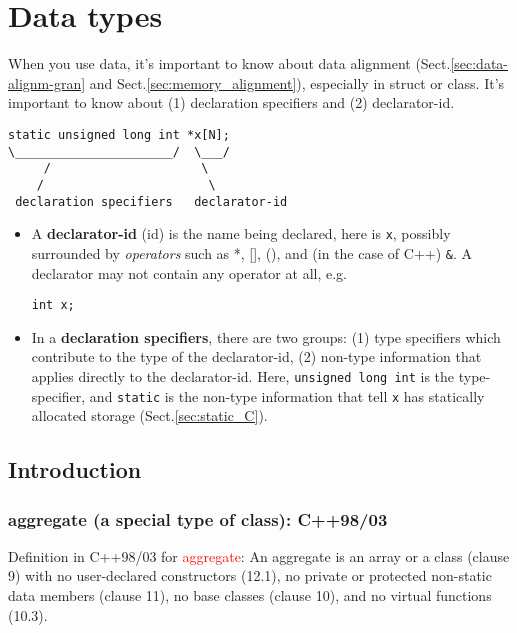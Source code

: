 \chapter{Data types}

When you use data, it's important to know about data alignment
(Sect.\ref{sec:data-alignm-gran} and Sect.\ref{sec:memory_alignment}),
especially in struct or class. It's important to know about (1) declaration
specifiers and (2) declarator-id.
\begin{verbatim}
static unsigned long int *x[N];
\______________________/  \___/
     /                     \
    /                       \
 declaration specifiers   declarator-id   
\end{verbatim}

\begin{itemize}
  \item  A {\bf declarator-id} (id) is the name being declared, here is \verb!x!, possibly
surrounded by {\it operators} such as *, [], (), and (in the case of C++)
\verb!&!.  A declarator may not contain any operator at all, e.g.
\begin{verbatim}
int x;
\end{verbatim}

   \item In a {\bf declaration specifiers}, there are two groups: (1) type specifiers which
contribute to the type of the declarator-id, (2) non-type information that
applies directly to the declarator-id. Here, \verb!unsigned long int! is the
type-specifier, and \verb!static! is the non-type information that tell \verb!x!
has statically allocated storage (Sect.\ref{sec:static_C}).
\end{itemize}


\section{Introduction}

\subsection{aggregate (a special type of class): C++98/03}
\label{sec:aggregate-class}
\label{sec:aggregate-class-C++98-C++03}

Definition in C++98/03 for \textcolor{red}{aggregate}: An aggregate is an array
or a class (clause 9) with no user-declared constructors (12.1), no private or
protected non-static data members (clause 11), no base classes (clause 10), and
no virtual functions (10.3).

